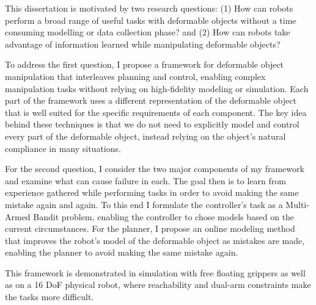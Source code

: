 This dissertation is motivated by two research questions: (1) How can robots perform a broad range of useful tasks with deformable objects without a time consuming modelling or data collection phase? and (2) How can robots take advantage of information learned while manipulating deformable objects?
        
To address the first question, I propose a framework for deformable object manipulation that interleaves planning and control, enabling complex manipulation tasks without relying on high-fidelity modeling or simulation. Each part of the framework uses a different representation of the deformable object that is well suited for the specific requirements of each component. The key idea behind these techniques is that we do not need to explicitly model and control every part of the deformable object, instead relying on the object's natural compliance in many situations. 

For the second question, I consider the two major components of my framework and examine what can cause failure in each. The goal then is to learn from experience gathered while performing tasks in order to avoid making the same mistake again and again. To this end I formulate the controller's task as a Multi-Armed Bandit problem, enabling the controller to chose models based on the current circumstances. For the planner, I propose an online modeling method that improves the robot's model of the deformable object as mistakes are made, enabling the planner to avoid making the same mistake again.

This framework is demonstrated in simulation with free floating grippers as well as on a 16 DoF physical robot, where reachability and dual-arm constraints make the tasks more difficult.